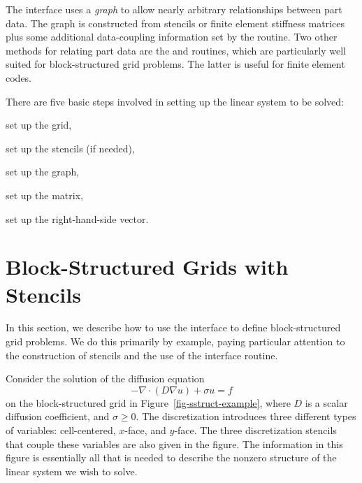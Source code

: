 The  interface uses a {\em graph} to allow nearly arbitrary
relationships between part data.  The graph is constructed from stencils or
finite element stiffness matrices plus some additional data-coupling information
set by the  routine.  Two other methods for relating
part data are the  and 
routines, which are particularly well suited for block-structured grid problems.
The latter is useful for finite element codes.

There are five basic steps involved in setting up the linear system to be
solved:
\begin{list}{.}{\setlength{\itemsep}{0in}}
\item set up the grid,
\item set up the stencils (if needed),
\item set up the graph,
\item set up the matrix,
\item set up the right-hand-side vector.
\end{list}


\section{Block-Structured Grids with Stencils}
\label{sec-Block-Structured-Grids}

In this section, we describe how to use the  interface to define
block-structured grid problems.  We do this primarily by example, paying
particular attention to the construction of stencils and the use of the
 interface routine.

Consider the solution of the diffusion equation
\begin{equation} \label{eqn-block-diffusion}
- \nabla \cdot (D \nabla u) + \sigma u = f
\end{equation}
on the block-structured grid in Figure~\ref{fig-sstruct-example}, where $D$ is
a scalar diffusion coefficient, and $\sigma \geq 0$.  The discretization
\cite{JEMorel_RMRoberts_MJShashkov_1998} introduces three different types of
variables: cell-centered, $x$-face, and $y$-face.  The three discretization
stencils that couple these variables are also given in the figure.  The
information in this figure is essentially all that is needed to describe the
nonzero structure of the linear system we wish to solve.

